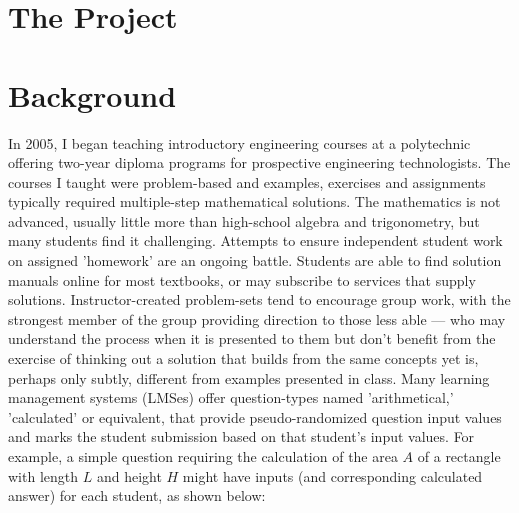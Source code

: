 \documentclass{tufte-handout}
\begin{document}
\section{\LARGE The Project}\label{sec:project}

\section{Background}\label{sec:background}
In 2005, I began teaching introductory engineering courses at a polytechnic offering two-year diploma programs for prospective engineering technologists. The courses I taught were problem-based and examples, exercises and assignments typically required multiple-step mathematical solutions. The mathematics is not advanced, usually little more than high-school algebra and trigonometry, but many students find it challenging.
\parm
Attempts to ensure independent student work on assigned 'homework' are an ongoing battle. Students are able to find solution manuals online for most textbooks, or may subscribe to services that supply solutions. Instructor-created problem-sets tend to encourage group work, with the strongest member of the group providing direction to those less able --- who may understand the process when it is presented to them but don't benefit from the exercise of thinking out a solution that builds from the same concepts yet is, perhaps only subtly, different from examples presented in class.
\parm
Many learning management systems (LMSes) offer question-types named 'arithmetical,' 'calculated' or equivalent, that provide pseudo-randomized question input values and marks the student submission based on that student's input values. For example, a simple question requiring the calculation of the area $A$ of a rectangle with length $L$ and height $H$ might have inputs (and corresponding calculated answer) for each student, as shown below:
\end{document}
